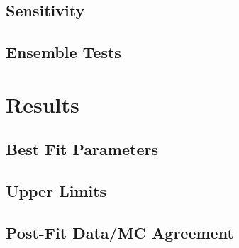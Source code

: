 \subsection{Sensitivity}

\subsection{Ensemble Tests}


\section{Results}

\subsection{Best Fit Parameters}

\subsection{Upper Limits}

\subsection{Post-Fit Data/MC Agreement}
